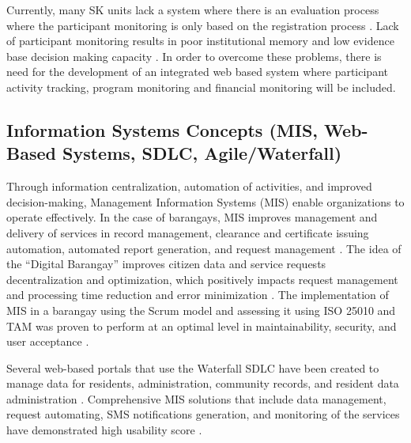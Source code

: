 \hspace*{\parindent}Currently, many SK units lack a system where there is an evaluation process where the participant monitoring is only based on the registration process \cite{AB,AP}. Lack of participant monitoring results in poor institutional memory and low evidence base decision making capacity \cite{AB,AP}. In order to overcome these problems, there is need for the development of an integrated web based system where participant activity tracking, program monitoring and financial monitoring will be included.
\vspace{5mm}

\subsection{Information Systems Concepts (MIS, Web-Based Systems, SDLC, Agile/Waterfall)}

\hspace*{\parindent}Through information centralization, automation of activities, and improved decision-making, Management Information Systems (MIS) enable organizations to operate effectively. In the case of barangays, MIS improves management and delivery of services in record management, clearance and certificate issuing automation, automated report generation, and request management \cite{D}. The idea of the ``Digital Barangay'' improves citizen data and service requests decentralization and optimization, which positively impacts request management and processing time reduction and error minimization \cite{V}. The implementation of MIS in a barangay using the Scrum model and assessing it using ISO 25010 and TAM was proven to perform at an optimal level in maintainability, security, and user acceptance \cite{AM}.
\vspace{5mm}

\hspace*{\parindent}Several web-based portals that use the Waterfall SDLC have been created to manage data for residents, administration, community records, and resident data administration \cite{C,D}. Comprehensive MIS solutions that include data management, request automating, SMS notifications generation, and monitoring of the services have demonstrated high usability score \cite{AM}.
\vspace{5mm}

